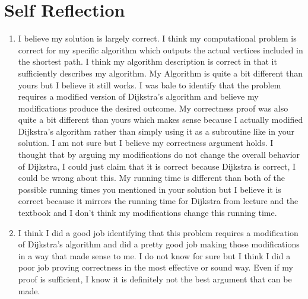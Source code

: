 \documentclass[11pt]{article}
\theoremstyle{nonumberplain}
\begin{document}

\section*{Self Reflection}


\begin{enumerate}
\item I believe my solution is largely correct. I think my computational problem is correct for my specific algorithm which outputs the actual vertices included in the shortest path. I think my algorithm description is correct in that it sufficiently describes my algorithm. My Algorithm is quite a bit different than yours but I believe it still works. I was bale to identify that the problem requires a modified version of Dijkstra's algorithm and believe my modifications produce the desired outcome. My correctness proof was also quite a bit different than yours which makes sense because I actually modified Dijkstra's algorithm rather than simply using it as a subroutine like in your solution. I am not sure but I believe my correctness argument holds. I thought that by arguing my modifications do not change the overall behavior of Dijkstra, I could just claim that it is correct because Dijkstra is correct, I could be wrong about this. My running time is different than both of the possible running times you mentioned in your solution but I believe it is correct because it mirrors the running time for Dijkstra from lecture and the textbook and I don't think my modifications change this running time.
\item I think I did a good job identifying that this problem requires a modification of Dijkstra's algorithm and did a pretty good job making those modifications in a way that made sense to me. I do not know for sure but I think I did a poor job proving correctness in the most effective or sound way. Even if my proof is sufficient, I know it is definitely not the best argument that can be made.

\end{enumerate}
\end{document}
